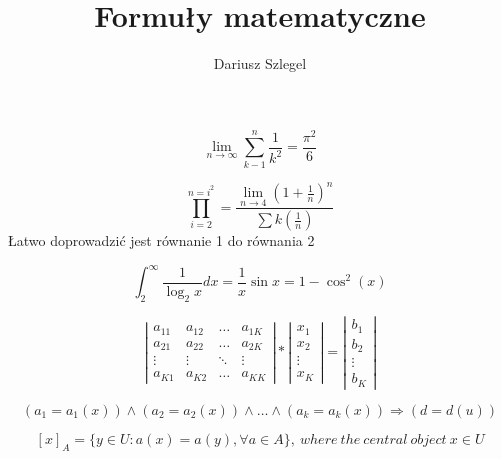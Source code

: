 \documentclass[a4paper,12pt]{article}
\title{Formuły matematyczne}
\author{Dariusz Szlegel}
\begin{document}
\maketitle

\begin{equation}
\lim_{n \to \infty} \sum_{k-1}^n\frac{1}{k^2}=\frac{\pi^2}{6} 
\label{eq:rownanie1}
\end{equation}

\begin{equation}
\prod_{i=2}^{n=i^2}=\frac{\lim_{n \to 4} \left (1+\frac{1}{n} \right)^n}{\sum k \left(\frac{1}{n}\right)}
\end{equation}
Łatwo doprowadzić jest równanie 1 do równania 2

\begin{equation}
\int_{2}^{\infty}\frac{1}{\log_{2}x}dx=\frac{1}{x}\sin x=1-\cos^2(x)
\label{eq:rownanie3}
\end{equation}

\begin{equation}
\left| \begin{array}{cccc}
a_{11} & a_{12} & \ldots & a_{1K}\\
a_{21} & a_{22} & \ldots & a_{2K}\\
\vdots & \vdots & \ddots & \vdots\\
a_{K1} & a_{K2} & \ldots & a_{KK}
\end{array} \right| * \left| \begin{array}{c}
x_{1}\\
x_{2}\\
\vdots\\
x_{K}
\end{array} \right| = \left| \begin{array}{c}
b_{1}\\
b_{2}\\
\vdots\\
b_{K}
\end{array} \right|
\label{eq:rownanie4}
\end{equation}

\begin{equation}
\left(a_1=a_1(x)\right)\wedge\left(a_2=a_2(x)\right)\wedge\ldots\wedge\left(a_k=a_k(x)\right)\Rightarrow\left(d=d(u)\right)
\label{eq:rownanie5}
\end{equation}

\begin{equation}
\left[x\right]_A=\{y\in U : a(x) = a(y), \forall a \in A\}, \ where \ the \ central \ object \ x \in U
\label{eq:rownanie6}
\end{equation}
\end{document}
